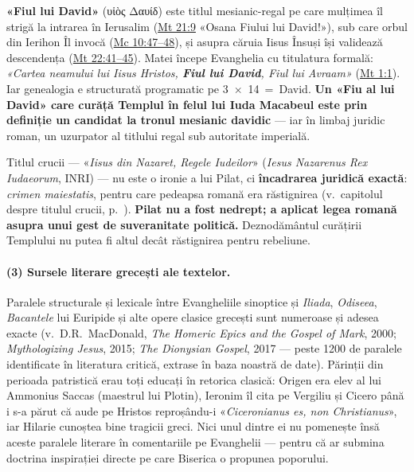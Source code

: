 \documentclass[12pt,a4paper,twoside,openany]{book}
\begin{document}
\textbf{«Fiul lui David»} (υἱὸς Δαυίδ) este titlul mesianic-regal pe care mulțimea îl strigă la intrarea în Ierusalim (\href{https://bibliaortodoxa.ro/carte.php?id=55\&cap=21\#9}{Mt 21:9} «Osana Fiului lui David!»), sub care orbul din Ierihon Îl invocă (\href{https://bibliaortodoxa.ro/carte.php?id=53\&cap=10\#47}{Mc 10:47--48}), și asupra căruia Iisus Însuși își validează descendența (\href{https://bibliaortodoxa.ro/carte.php?id=55\&cap=22\#41}{Mt 22:41--45}). Matei începe Evanghelia cu titulatura formală: \textit{«Cartea neamului lui Iisus Hristos, \textbf{Fiul lui David}, Fiul lui Avraam»} (\href{https://bibliaortodoxa.ro/carte.php?id=55\&cap=1\#1}{Mt 1:1}). Iar genealogia e structurată programatic pe 3~$\times$~14~=~David. \textbf{Un «Fiu al lui David» care curăță Templul în felul lui Iuda Macabeul este prin definiție un candidat la tronul mesianic davidic} --- iar în limbaj juridic roman, un uzurpator al titlului regal sub autoritate imperială.

Titlul crucii --- «\textit{Iisus din Nazaret, Regele Iudeilor}» (\textit{Iesus Nazarenus Rex Iudaeorum}, INRI) --- nu este o ironie a lui Pilat, ci \textbf{încadrarea juridică exactă}: \textit{crimen maiestatis}, pentru care pedeapsa romană era răstignirea (v.~capitolul despre titulul crucii, p.~\pageref{titulus}). \textbf{Pilat nu a fost nedrept; a aplicat legea romană asupra unui gest de suveranitate politică.} Deznodământul curățirii Templului nu putea fi altul decât răstignirea pentru rebeliune.

\paragraph*{(3) Sursele literare grecești ale textelor.} Paralele structurale și lexicale între Evangheliile sinoptice și \textit{Iliada}, \textit{Odiseea}, \textit{Bacantele} lui Euripide și alte opere clasice grecești sunt numeroase și adesea exacte (v.~D.R.~MacDonald, \textit{The Homeric Epics and the Gospel of Mark}, 2000; \textit{Mythologizing Jesus}, 2015; \textit{The Dionysian Gospel}, 2017 --- peste 1200 de paralele identificate în literatura critică, extrase în baza noastră de date). Părinții din perioada patristică erau toți educați în retorica clasică: Origen era elev al lui Ammonius Saccas (maestrul lui Plotin), Ieronim îl cita pe Vergiliu și Cicero până i s-a părut că aude pe Hristos reproșându-i «\textit{Ciceronianus es, non Christianus}», iar Hilarie cunoștea bine tragicii greci. Nici unul dintre ei nu pomenește însă aceste paralele literare în comentariile pe Evanghelii --- pentru că ar submina doctrina inspirației directe pe care Biserica o propunea poporului.
\end{document}
